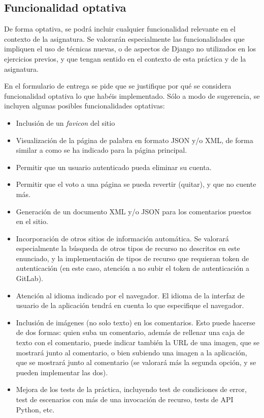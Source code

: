 \subsection{Funcionalidad optativa}

De forma optativa, se podrá incluir cualquier funcionalidad relevante en el contexto de la asignatura. Se valorarán especialmente las funcionalidades que impliquen el uso de técnicas nuevas, o de aspectos de Django no utilizados en los ejercicios previos, y que tengan sentido en el contexto de esta práctica y de la asignatura.

En el formulario de entrega se pide que se justifique por qué se considera funcionalidad optativa lo que habéis implementado. Sólo a modo de sugerencia, se incluyen algunas posibles funcionalidades optativas:

\begin{itemize}
  \item Inclusión de un \emph{favicon} del sitio
  
  \item Visualización de la página de palabra en formato JSON y/o XML, de forma similar a como se ha indicado para la página principal.

  \item Permitir que un usuario autenticado pueda eliminar su cuenta.

  \item Permitir que el voto a una página se pueda revertir (quitar), y que no cuente más.

  \item Generación de un documento XML y/o JSON para los comentarios puestos en el sitio.

  \item Incorporación de otros sitios de información automática. Se valorará especialmente la búsqueda de otros tipos de recurso no descritos en este enunciado, y la implementación de tipos de recurso que requieran token de autenticación (en este caso, atención a no subir el token de autenticación a GitLab).
 
  \item Atención al idioma indicado por el navegador. El idioma de la interfaz de usuario de la aplicación tendrá en cuenta lo que especifique el navegador.

  \item Inclusión de imágenes (no solo texto) en los comentarios. Esto puede hacerse de dos formas: quien suba un comentario, además de rellenar una caja de texto con el comentario, puede indicar también la URL de una imagen, que se mostrará junto al comentario, o bien subiendo una imagen a la aplicación, que se mostrará junto al comentario (se valorará más la segunda opción, y se pueden implementar las dos).
    
  \item Mejora de los tests de la práctica, incluyendo test de condiciones de error, test de escenarios con más de una invocación de recurso, tests de API Python, etc.
\end{itemize}

